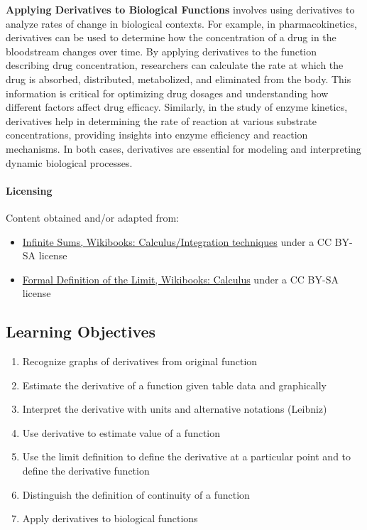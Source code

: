 \textbf{Applying Derivatives to Biological Functions} involves using derivatives to analyze rates of change in biological contexts. For example, in pharmacokinetics, derivatives can be used to determine how the concentration of a drug in the bloodstream changes over time. By applying derivatives to the function describing drug concentration, researchers can calculate the rate at which the drug is absorbed, distributed, metabolized, and eliminated from the body. This information is critical for optimizing drug dosages and understanding how different factors affect drug efficacy. Similarly, in the study of enzyme kinetics, derivatives help in determining the rate of reaction at various substrate concentrations, providing insights into enzyme efficiency and reaction mechanisms. In both cases, derivatives are essential for modeling and interpreting dynamic biological processes.

\paragraph{Licensing}

Content obtained and/or adapted from:

\begin{itemize}
    \item \href{https://en.wikibooks.org/wiki/Calculus/Integration_techniques/Infinite_Sums}{Infinite Sums, Wikibooks: Calculus/Integration techniques} under a CC BY-SA license
    \item \href{https://en.wikibooks.org/wiki/Calculus/Formal_Definition_of_the_Limit}{Formal Definition of the Limit, Wikibooks: Calculus} under a CC BY-SA license
\end{itemize}

\subsection{Learning Objectives}

\begin{enumerate}
    \item Recognize graphs of derivatives from original function
    \item Estimate the derivative of a function given table data and graphically
    \item Interpret the derivative with units and alternative notations (Leibniz)
    \item Use derivative to estimate value of a function
    \item Use the limit definition to define the derivative at a particular point and to define the derivative function
    \item Distinguish the definition of continuity of a function
    \item Apply derivatives to biological functions
\end{enumerate}

